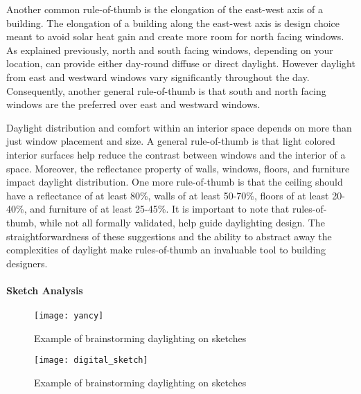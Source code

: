   Another common rule-of-thumb is the elongation of the east-west axis of a building.
  The elongation of a building along the east-west axis is design choice meant to avoid solar heat gain and create more room for north facing windows\cite{Leslie}.
  As explained previously, north and south facing windows, depending on your location, can provide either day-round diffuse or direct daylight.
  However daylight from east and westward windows vary significantly throughout the day.
  Consequently, another general rule-of-thumb is that south and north facing windows are the preferred over east and westward windows\cite{reinhart_lecture}.

  Daylight distribution and comfort within an interior space depends on more than just window placement and size.
  A general rule-of-thumb is that light colored interior surfaces help reduce the contrast between windows and the interior of a space\cite{Leslie}.
  Moreover, the reflectance property of walls, windows, floors, and furniture impact daylight distribution.
  One more rule-of-thumb is that the ceiling should have a reflectance of at least 80\%, walls of at least 50-70\%, floors of at least 20-40\%, and furniture of at least 25-45\%\cite{reinhart_lecture}.
  It is important to note that rules-of-thumb, while not all formally validated, help guide daylighting design.
  The straightforwardness of these suggestions and the ability to abstract away the complexities of daylight make rules-of-thumb an invaluable tool to building designers.

  \paragraph{Sketch Analysis}
  \begin{figure}[h]
    \centering
    \begin{minipage}[b]{0.4\textwidth}
      \centering
      \texttt{[image: yancy]}
      \caption{Example of brainstorming daylighting on sketches}
      \label{fig:yancy}
    \end{minipage}
    \hfill
    \begin{minipage}[b]{0.4\textwidth}
      \centering
      \texttt{[image: digital\_sketch]}
      \caption{Example of brainstorming daylighting on sketches}
      \label{fig:digital_sketch}
    \end{minipage}
  \end{figure}

